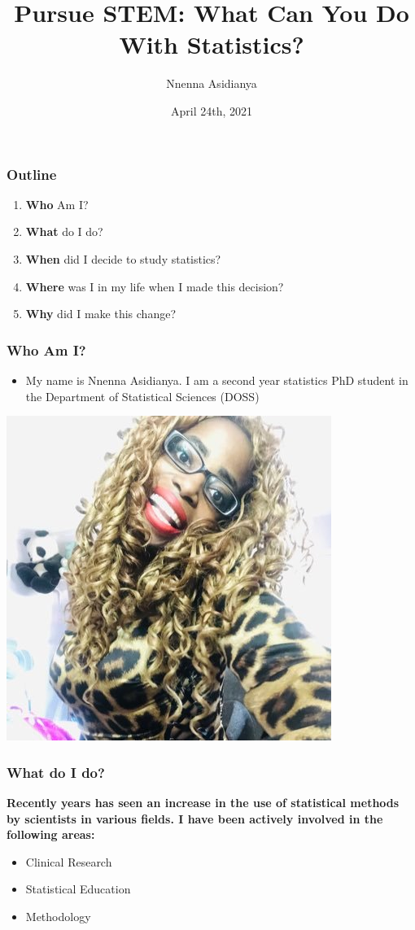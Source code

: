 \documentclass{beamer}
\title[Short title]{Pursue STEM: What Can You Do With Statistics?} %
\author{Nnenna Asidianya} %
\institute[U of T] %
{
University of Toronto \\ %
\medskip
\textit{nnenna.asidianya@mail.utoronto.ca} %
}
\date{April 24th, 2021} %
\begin{document}
\begin{frame}
\titlepage %
\end{frame}

\begin{frame}
\frametitle{Outline} %

\begin{enumerate}
	\item \textbf{Who} Am I?
	\item \textbf{What} do I do?
	\item  \textbf{When} did I decide to study statistics?
	\item \textbf{Where} was I in my life when I made this decision?
	\item \textbf{Why} did I make this change?
\end{enumerate}

\end{frame}




\begin{frame}
\frametitle{\textbf{Who} Am I?}
\begin{itemize}
	\item My name is Nnenna Asidianya. I am a second year statistics PhD student in the Department of Statistical Sciences (DOSS)
\end{itemize}
	\begin{center}
	\includegraphics[width=0.4\linewidth]{me.jpg}
	\begin{figure}[H]
	\end{figure}
\end{center}


\end{frame}


\begin{frame}
\frametitle{ \textbf{What} do I do?}
\textbf{Recently years has seen an increase in the use of statistical methods by scientists in various fields. I have been actively involved in the following areas:}\\
\begin{itemize}
	\item Clinical Research 
	\item Statistical Education 
	\item Methodology 
\end{itemize}
\end{frame}
\end{document}
